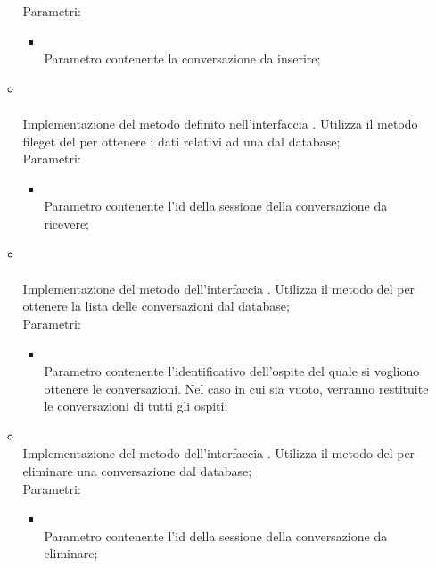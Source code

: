 \begin{itemize}
\begin{itemize}
		Parametri:
		\begin{itemize}
			\item {} \\
			Parametro contenente la conversazione da inserire;
		\end{itemize}
		\item[]  \\\\		Implementazione del metodo definito nell'interfaccia . Utilizza il metodo file{get} del  per ottenere i dati relativi ad una  dal database;\\
		Parametri:
		\begin{itemize}
			\item {} \\
			Parametro contenente l'id della sessione della conversazione da ricevere;
		\end{itemize}
		\item[] \\ \\		Implementazione del metodo dell'interfaccia . Utilizza il metodo  del  per ottenere la lista delle conversazioni dal database;\\
		Parametri:
		\begin{itemize}
			\item {} \\
			Parametro contenente l'identificativo dell'ospite del quale si vogliono ottenere le conversazioni. Nel caso in cui sia vuoto, verranno restituite le conversazioni di tutti gli ospiti;
		\end{itemize}
		\item[]  \\		Implementazione del metodo dell'interfaccia . Utilizza il metodo  del  per eliminare una conversazione dal database;\\
		Parametri:
		\begin{itemize}
			\item {} \\
			Parametro contenente l'id della sessione della conversazione da eliminare;
		\end{itemize}

\end{itemize}
\end{itemize}
